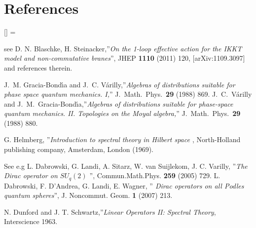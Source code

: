 \documentclass[a4paper,11pt,twoside]{article}
\numberwithin{equation}{section}
\theoremstyle{nonumberplain}
\newcounter{and}
\renewenvironment{thebibliography}[1]{%
\section*{References}%
\frenchspacing\small%
\begin{list}{[\arabic{enumi}]}%
{%
\usecounter{enumi}\parsep=2pt\topsep 0pt%
\settowidth{\labelwidth}{[#1]}%
\leftmargin=\labelwidth\advance\leftmargin\labelsep%
\rightmargin=0pt\itemsep=1pt\sloppy%
}%
}{\end{list}}
\begin{document}
\begin{thebibliography}{50}
 see D. N. Blaschke, H. Steinacker,''{\it{On the 1-loop effective action for the IKKT model and non-commutative branes}}'', JHEP {\bf{1110}} (2011) 120, [arXiv:1109.3097] and references therein.

  J.~M. Gracia-Bond{\'\i}a and J.~C.
  V{\'a}rilly,''{\it{Algebras of distributions suitable for phase space
  quantum mechanics. {I},}}'' J.\ Math.\ Phys.\ {\bf 29} (1988) 869. J.~C.~V{\'a}rilly and J.~M.~Gracia-Bond{\'\i}a,''{\it{Algebras of distributions suitable for phase-space
quantum mechanics. {II}.
  Topologies on the Moyal algebra,}}''
  J.\ Math.\ Phys.\  {\bf 29} (1988) 880.

 G. Helmberg, ''{\it{Introduction to spectral theory in Hilbert space }}, North-Holland publishing company, Amsterdam, London (1969).

 See e.g
L. Dabrowski, G. Landi, A. Sitarz, W. van Suijlekom, J. C. Varilly, ''{\it{The Dirac operator on $SU_q(2)$ }}'', Commun.Math.Phys. {\bf{259}} (2005) 729. L. Dabrowski, F. D'Andrea, G. Landi, E. Wagner, ''{\it{ Dirac operators on all Podles quantum spheres}}'', J. Noncommut. Geom. {\bf{1}} (2007) 213.

 N. Dunford and J. T. Schwartz,''{\it{Linear Operators II: Spectral Theory}}, Interscience 1963.


\end{thebibliography}
\end{document}
